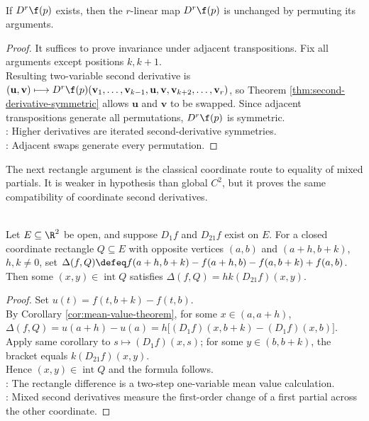 \begin{corollary} \label{cor:higher-derivatives-symmetric} \\
If $D^r\f(p)$ exists, then the $r$-linear map $D^r\f(p)$ is unchanged by permuting its arguments.
\begin{proof}
It suffices to prove invariance under adjacent transpositions. Fix all arguments except positions $k,k+1$.\\
Resulting two-variable second derivative is $(\mathbf{u},\mathbf{v})\longmapsto D^r\f(p)(\mathbf{v}_1,\ldots,\mathbf{v}_{k-1},\mathbf{u},\mathbf{v},\mathbf{v}_{k+2},\ldots,\mathbf{v}_r)$, so Theorem \ref{thm:second-derivative-symmetric} allows $\mathbf{u}$ and $\mathbf{v}$ to be swapped. Since adjacent transpositions generate all permutations, $D^r\f(p)$ is symmetric.\\
: Higher derivatives are iterated second-derivative symmetries.\\
: Adjacent swaps generate every permutation.
\end{proof}
\end{corollary}

The next rectangle argument is the classical coordinate route to equality of mixed partials. It is weaker in hypothesis than global $C^2$, but it proves the same compatibility of coordinate second derivatives.

\begin{theorem} \label{thm:rectangle-mean-value-mixed-partial} \\
Let $E\subseteq\R^2$ be open, and suppose $D_1f$ and $D_{21}f$ exist on $E$. For a closed coordinate rectangle $Q\subseteq E$ with opposite vertices $(a,b)$ and $(a+h,b+k)$, $h,k\neq0$, set $\Delta(f,Q)\defeq f(a+h,b+k)-f(a+h,b)-f(a,b+k)+f(a,b)$.\\
Then some $(x,y)\in\operatorname{int}Q$ satisfies $\Delta(f,Q)=hk(D_{21}f)(x,y)$.
\begin{proof}
Set $u(t)=f(t,b+k)-f(t,b)$.\\
By Corollary \ref{cor:mean-value-theorem}, for some $x \in (a, a+h)$, $\Delta(f,Q)=u(a+h)-u(a)=h\bigl[(D_1f)(x,b+k)-(D_1f)(x,b)\bigr]$.\\
Apply same corollary to $s\mapsto(D_1f)(x,s)$; for some $y \in (b, b+k)$, the bracket equals $k(D_{21}f)(x,y)$.\\
Hence $(x,y)\in\operatorname{int}Q$ and the formula follows.\\
: The rectangle difference is a two-step one-variable mean value calculation.\\
: Mixed second derivatives measure the first-order change of a first partial across the other coordinate.
\end{proof}
\end{theorem}

